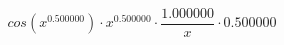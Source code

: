 \documentclass{article}
\begin{document}
$$cos(x^{0.500000}) \cdot x^{0.500000} \cdot \frac{1.000000}{x} \cdot 0.500000$$
\end{document}

